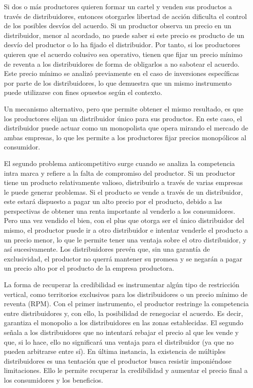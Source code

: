 \documentclass[
  12pt,
  spanish,
]{book}
\begin{document}
Si dos o más productores quieren formar un cartel y venden sus productos a través de distribuidores, entonces otorgarles libertad de acción dificulta el control de los posibles desvíos del acuerdo. Si un productor observa un precio en un distribuidor, menor al acordado, no puede saber si este precio es producto de un desvío del productor o lo ha fijado el distribuidor. Por tanto, si los productores quieren que el acuerdo colusivo sea operativo, tienen que fijar un precio mínimo de reventa a los distribuidores de forma de obligarlos a no sabotear el acuerdo. Este precio mínimo se analizó previamente en el caso de inversiones específicas por parte de los distribuidores, lo que demuestra que un mismo instrumento puede utilizarse con fines opuestos según el contexto.

Un mecanismo alternativo, pero que permite obtener el mismo resultado, es que los productores elijan un distribuidor único para sus productos. En este caso, el distribuidor puede actuar como un monopolista que opera mirando el mercado de ambas empresas, lo que les permite a los productores fijar precios monopólicos al
consumidor.

El segundo problema anticompetitivo surge cuando se analiza la competencia intra marca y refiere a la falta de compromiso del productor. Si un productor tiene un producto relativamente valioso, distribuirlo a través de varias empresas le puede generar problemas. Si el producto se vende a través de un distribuidor, este estará dispuesto a pagar un alto precio por el producto, debido a las perspectivas de obtener una renta importante al venderlo a los consumidores. Pero una vez vendido el bien, con el plus que otorga ser el único distribuidor del mismo, el productor puede ir a otro distribuidor e intentar venderle el producto a un precio menor, lo que le permite tener una ventaja sobre el otro distribuidor, y así sucesivamente. Los distribuidores prevén que, sin una garantía de exclusividad, el productor no querrá mantener su promesa y se negarán a pagar un precio alto por el producto de la empresa productora.

La forma de recuperar la credibilidad es instrumentar algún tipo de restricción vertical, como territorios exclusivos para los distribuidores o un precio mínimo de reventa (RPM). Con el primer instrumento, el productor restringe la competencia entre distribuidores y, con ello, la posibilidad de renegociar el acuerdo. Es decir, garantiza el monopolio a los distribuidores en las zonas establecidas. El segundo señala a los distribuidores que no intentará rebajar el precio al que les vende y que, si lo hace, ello no significará una ventaja para el distribuidor (ya que no pueden arbitrarse entre sí). En última instancia, la existencia de múltiples distribuidores es una tentación que el productor busca resistir imponiéndose limitaciones. Ello le permite recuperar la credibilidad y aumentar el precio final a los consumidores y los beneficios.
\end{document}
